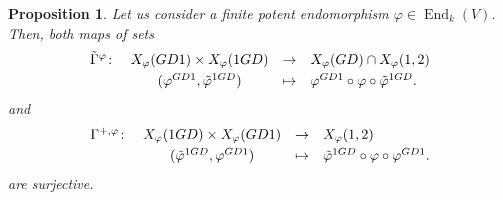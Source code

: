 \documentclass[10pt,a4paper]{amsart}
\newtheorem{prop}[defn]{Proposition}
\theoremstyle{plain}
\theoremstyle{remark}
\numberwithin{equation}{section} \numberwithin{defn}{section}
\newcommand\ed{\operatorname{End}}
\newcommand{\f}{\varphi}
\begin{document}
\begin{prop}\label{P: CompGD11GD 1GDGD1}
Let us consider a finite potent endomorphism $\f \in \ed_k(V).$ Then, both maps of sets
$$\begin{array}{rccl}
\tilde{\Gamma}^{\f} \colon & X_{\f}(GD1)\times X_{\f}(1GD)  & \rightarrow & X_{\f}(GD)\cap X_{\f}(1,2) \smallskip\\
& (\f^{GD1},\tilde{\f}^{1GD}) & \mapsto & \f^{GD1}\circ \f \circ \tilde{\f}^{1GD}.
\end{array} $$ 
and 
$$\begin{array}{rccl}
\Gamma^{+,\f} \colon & X_{\f}(1GD)\times X_{\f}(GD1)  & \rightarrow & X_{\f}(1,2) \smallskip\\
& (\tilde{\f}^{1GD},\f^{GD1}) & \mapsto & \tilde{\f}^{1GD}\circ \f \circ \f^{GD1}.
\end{array} $$
are surjective.
\end{prop}
\end{document}
